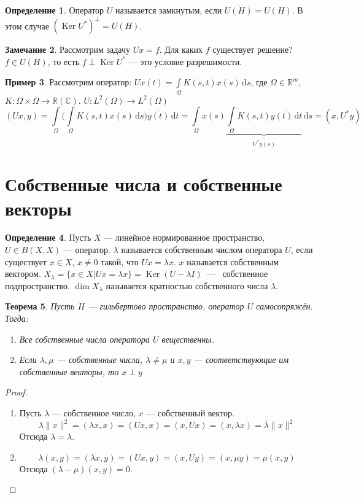 \documentclass[11pt,openany,a4paper]{scrartcl}
\theoremstyle{plain}
\newtheorem{theorem}{Теорема}[section]
\theoremstyle{definition}
\newtheorem{definition}[theorem]{Определение}
\newtheorem{remark}[theorem]{Замечание}
\newtheorem{example}[theorem]{Пример}
\newcommand\mb{\mathbb}
\newcommand\real{\mb R}
\newcommand{\complex}{\mb C}
\newcommand{\dif}{\, \mathrm d}
\newcommand\ol{\overline}
\DeclareMathOperator{\Ker}{Ker}
\begin{document}
\begin{definition}
    Оператор $U$ называется замкнутым, если $\ol{U(H)} = U(H)$. В этом случае
    $(\Ker U^\ast)^\perp = U(H)$.
\end{definition}
\begin{remark}
    Рассмотрим задачу $Ux = f$. Для каких $f$ существует решение?
    $f \in U(H)$, то есть $f \perp \Ker U^\ast$ — это условие разрешимости.
\end{remark}

\begin{example}
    Рассмотрим оператор: $Ux(t) = \int\limits_{\Omega} K(s, t)x(s) \dif s$,
    где $\Omega \in \real^m$, $K: \Omega \times \Omega \to \real(\complex)$.
    $U: L^2(\Omega) \to L^2(\Omega)$
    $$
    (Ux, y) = \int\limits_\Omega \bigg(\int\limits_\Omega
    K(s, t) x(s) \dif s\bigg) \ol{y(t)} \dif t =
    \int\limits_\Omega x(s) \underbrace{\int\limits_\Omega
    K(s, t) \ol{y(t) \dif t}}_{\ol{U^\ast y(s)}} \dif s = (x, U^\ast y)
    $$
\end{example}

\section{Собственные числа и собственные векторы}

\begin{definition}
    Пусть $X$ — линейное нормированное пространство, $U \in B(X, X)$ — оператор.
    $\lambda$ называется собственным числом оператора $U$, если существует
    $x \in X$, $x \neq 0$ такой, что $Ux = \lambda x$. $x$ называется собственным
    вектором.
    $X_\lambda = \{x \in X \Big | Ux = \lambda x\} = \Ker(U - \lambda I)$~—~
    собственное подпространство. $\dim X_\lambda$ называется кратностью 
    собственного числа $\lambda$.
\end{definition}

\begin{theorem}
    Пусть $H$ — гильбертово пространство, оператор $U$ самосопряжён. Тогда:
    \begin{enumerate}
        \item Все собственные числа оператора $U$ вещественны.
        \item Если $\lambda, \mu$ — собственные числа, $\lambda \neq \mu$ и
        $x, y$ — соответствующие им собственные векторы, то $x \perp y$
    \end{enumerate}
\end{theorem}
\begin{proof}
\mbox{}
    \begin{enumerate}
        \item Пусть $\lambda$ — собственное число, $x$ — собственный вектор.
        $$
        \lambda\|x\|^2 = (\lambda x, x) = (Ux, x) = (x, Ux) = (x, \lambda x) =
        \ol{\lambda}\|x\|^2
        $$
        Отсюда $\lambda = \ol{\lambda}$.
        \item
        $$
        \lambda (x, y) = (\lambda x, y) = (Ux, y) = (x, Uy) = (x, \mu y) =
        \mu(x, y)
        $$
        Отсюда $(\lambda - \mu)(x, y) = 0$.
    \end{enumerate}
\end{proof}
\end{document}
